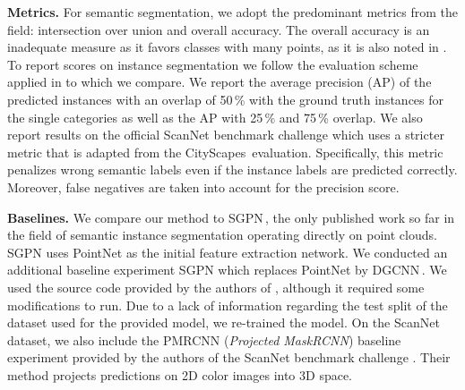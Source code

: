 \documentclass[runningheads]{llncs}
\newcommand{\subsubsubsection}[1]{\vspace{4px} \noindent \textbf{#1}}
\begin{document}
{\subsubsubsection{Metrics.}
For semantic segmentation, we adopt the predominant metrics from the field: intersection over union and overall accuracy.
The overall accuracy is an inadequate measure as it favors classes with many points, as it is also noted in \cite{Tatarchenko18CVPR}.
To report scores on instance segmentation we follow the evaluation scheme applied in \cite{Wang18CVPR} to which we compare.
We report the average precision (AP) of the predicted instances with an overlap of 50\,\% with the ground truth instances
for the single categories as well as the AP with 25\,\% and 75\,\% overlap.
We also report results on the official ScanNet benchmark challenge \cite{Dai17ScannetBenchmark}
which uses a stricter metric that is adapted from the CityScapes\,\cite{Cordts16CVPR} evaluation.
Specifically, this metric penalizes wrong semantic labels even if the instance labels are predicted correctly.
Moreover, false negatives are taken into account for the precision score.

\subsubsubsection{Baselines.}
We compare our method to SGPN\,\cite{Wang18CVPR}, the only published work so far in the field of semantic instance segmentation operating directly on point clouds.
SGPN uses PointNet \cite{Qi17CVPR} as the initial feature extraction network.
We conducted an additional  baseline experiment SGPN which replaces PointNet by DGCNN\,\cite{Wang18CoRR}.
We used the source code provided by the authors of \cite{Wang18CVPR}, although it required some modifications to run.
Due to a lack of information regarding the test split of the dataset used for the provided model, we re-trained the model.
On the ScanNet dataset, we also include the PMRCNN (\textit{Projected MaskRCNN}) baseline experiment provided by the authors of the ScanNet benchmark challenge \cite{Dai17ScannetBenchmark}.
Their method projects predictions on 2D color images into 3D space.

}
\end{document}
